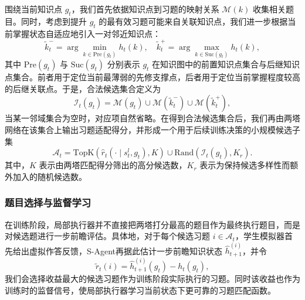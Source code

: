 \documentclass[UTF8,a4paper,zihao=5,twocolumn]{ctexart}
\begin{document}
围绕当前知识点 $g_t$，我们首先依据知识点到习题的映射关系 $\mathcal{M}(k)$ 收集相关题目。同时，考虑到提升 $g_t$ 的最有效习题可能来自关联知识点，我们进一步根据当前掌握状态自适应地引入一对邻近知识点：
\begin{equation}
\tilde{k}_t^{-}
=
\arg\min_{k\in \mathrm{Pre}(g_t)} h_t(k),\quad
\tilde{k}_t^{+}
=
\arg\max_{k\in \mathrm{Suc}(g_t)} h_t(k),
\end{equation}
其中 $\mathrm{Pre}(g_t)$ 与 $\mathrm{Suc}(g_t)$ 分别表示 $g_t$ 在知识图中的前置知识点集合与后继知识点集合。前者用于定位当前最薄弱的先修支撑点，后者用于定位当前掌握程度较高的后继关联点。于是，合法候选集合定义为
\begin{equation}
\mathcal{I}_t(g_t)
=
\mathcal{M}(g_t)\cup
\mathcal{M}(\tilde{k}_t^{-})\cup
\mathcal{M}(\tilde{k}_t^{+}),
\end{equation}
当某一邻域集合为空时，对应项自然省略。在得到合法候选集合后，我们再由两塔网络在该集合上输出习题适配得分，并形成一个用于后续训练决策的小规模候选子集
\begin{equation}
\mathcal{A}_t
=
\mathrm{TopK}\!\left(\hat{r}_{t}(\cdot\mid s_t^l,g_t),K\right)
\cup
\mathrm{Rand}\!\left(\mathcal{I}_t(g_t),K_r\right).
\end{equation}
其中，$K$ 表示由两塔匹配得分筛出的高分候选数，$K_r$ 表示为保持候选多样性而额外加入的随机候选数。

\subsubsection{题目选择与监督学习}

在训练阶段，局部执行器并不直接把两塔打分最高的题目作为最终执行题目，而是对候选题进行一步前瞻评估。具体地，对于每个候选习题 $i\in\mathcal{A}_t$，学生模拟器首先给出虚拟作答反馈，S-Agent再据此估计一步前瞻知识状态 $\hat{h}_{t+1}^{(i)}$，并令
\begin{equation}
\tilde{r}_t(i)=
\hat{h}_{t+1}^{(i)}(g_t)-h_t(g_t),
\end{equation}
我们会选择收益最大的候选习题作为训练阶段实际执行的习题。同时该收益也作为训练时的监督信号，使局部执行器学习当前状态下更可靠的习题匹配函数。
\end{document}

